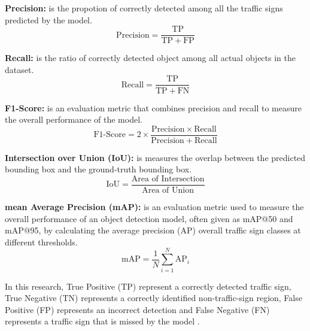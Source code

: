 \textbf{Precision:} is the propotion of correctly detected among all the traffic signs predicted by the model.
\begin{equation}
    \mathrm{Precision} = \frac{\mathrm{TP}}{\mathrm{TP} + \mathrm{FP}}
    \label{eq:precision}
\end{equation}

\textbf{Recall:} is the ratio of correctly detected object among all actual objects in the dataset.
\begin{equation}
    \mathrm{Recall} = \frac{\mathrm{TP}}{\mathrm{TP} + \mathrm{FN}}
    \label{eq:recall}
\end{equation}

\textbf{F1-Score:} is an evaluation metric that combines precision and recall to measure the overall performance of the model.
\begin{equation}
    \mathrm{F1\text{-}Score} =
    2 \times
    \frac{\mathrm{Precision} \times \mathrm{Recall}}
    {\mathrm{Precision} + \mathrm{Recall}}
    \label{eq:F1-Score}
\end{equation}

\textbf{Intersection over Union (IoU):} is measures the overlap between the predicted bounding box and the ground-truth bounding box.
\begin{equation}
    \mathrm{IoU} =
    \frac{\text{Area of Intersection}}
         {\text{Area of Union}}
    \label{eq:IoU}
\end{equation}

\textbf{mean Average Precision (mAP):} is an evaluation metric used to measure the overall performance of an object detection model,
often given as mAP@50 and mAP@95, by calculating the average precision (AP) overall traffic sign classes at different thresholds.
\begin{equation}
    \mathrm{mAP} =
    \frac{1}{N}
    \sum_{i=1}^{N} \mathrm{AP}_i
    \label{eq:mAP}
\end{equation}

In this research, True Positive (TP) represent a correctly detected traffic sign, True Negative (TN) represents a correctly identified non-traffic-sign region, 
False Positive (FP) represents an incorrect detection and False Negative (FN) represents a traffic sign that is missed by the model \cite{unknown-author-no-date}.